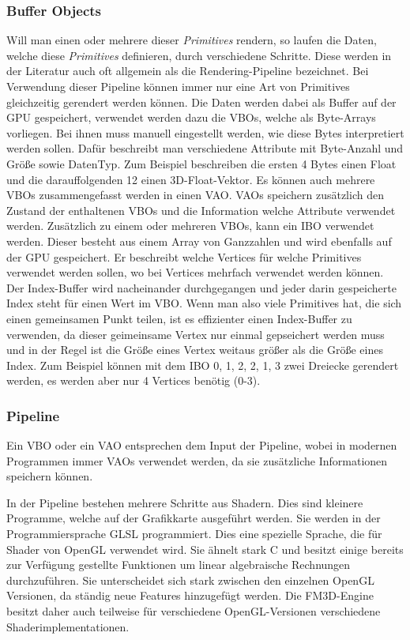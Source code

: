 \subsubsection{Buffer Objects}
Will man einen oder mehrere dieser \textit{Primitives} rendern, so laufen die Daten, welche diese \textit{Primitives} definieren, durch verschiedene Schritte. Diese werden in der Literatur auch oft allgemein als die Rendering-Pipeline bezeichnet. Bei Verwendung dieser Pipeline können immer nur eine Art von Primitives gleichzeitig gerendert werden können.
Die Daten werden dabei als Buffer auf der \ac{GPU} gespeichert, verwendet werden dazu die \acp{VBO}, welche als Byte-Arrays vorliegen. Bei ihnen muss manuell eingestellt werden, wie diese Bytes interpretiert werden sollen. Dafür beschreibt man verschiedene Attribute mit Byte-Anzahl und Größe sowie DatenTyp. Zum Beispiel beschreiben die ersten 4 Bytes einen Float und die darauffolgenden 12 einen 3D-Float-Vektor. Es können auch mehrere \ac{VBO}s zusammengefasst werden in einen \ac{VAO}. \acp{VAO} speichern zusätzlich den Zustand der enthaltenen \acp{VBO} und die Information welche Attribute verwendet werden. Zusätzlich zu einem oder mehreren \acp{VBO}, kann ein \ac{IBO} verwendet werden. Dieser besteht aus einem Array von Ganzzahlen und wird ebenfalls auf der \ac{GPU} gespeichert. Er beschreibt welche Vertices für welche Primitives verwendet werden sollen, wo bei Vertices mehrfach verwendet werden können. Der Index-Buffer wird nacheinander durchgegangen und jeder darin gespeicherte Index steht für einen Wert im \ac{VBO}. Wenn man also viele Primitives hat, die sich einen gemeinsamen Punkt teilen, ist es effizienter einen Index-Buffer zu verwenden, da dieser geimeinsame Vertex nur einmal gepseichert werden muss und in der Regel ist die Größe eines Vertex weitaus größer als die Größe eines Index. Zum Beispiel können mit dem \ac{IBO} { 0, 1, 2, 2, 1, 3} zwei Dreiecke gerendert werden, es werden aber nur 4 Vertices benötig (0-3).\cite{ThinMatrix}

\subsubsection{Pipeline\cite{Pipeline}}
Ein \ac{VBO} oder ein \ac{VAO} entsprechen dem Input der Pipeline, wobei in modernen Programmen immer \acp{VAO} verwendet werden, da sie zusätzliche Informationen speichern können.

In der Pipeline bestehen mehrere Schritte aus Shadern. Dies sind kleinere Programme, welche auf der Grafikkarte ausgeführt werden. Sie werden in der Programmiersprache GLSL programmiert. Dies eine spezielle Sprache, die für Shader von OpenGL verwendet wird. Sie ähnelt stark C und besitzt einige bereits zur Verfügung gestellte Funktionen um linear algebraische Rechnungen durchzuführen. Sie unterscheidet sich stark zwischen den einzelnen OpenGL Versionen, da ständig neue Features hinzugefügt werden. Die FM3D-Engine besitzt daher auch teilweise für verschiedene OpenGL-Versionen verschiedene Shaderimplementationen.


